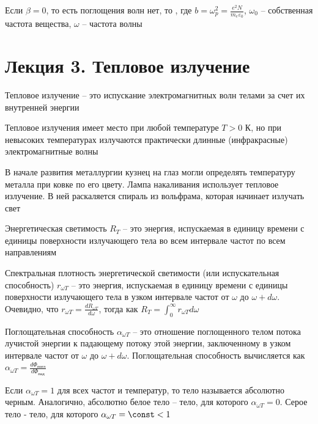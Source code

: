 \documentclass[12pt]{article}
\begin{document}
Если $\beta = 0$, то есть поглощения волн нет, то , где $b = \omega_p^2 = \frac{e^2 N}{m_e \varepsilon_0}$, $\omega_0$ -- собственная частота вещества, $\omega$ -- частота волны


\section{Лекция 3. Тепловое излучение}

Тепловое излучение -- это испускание электромагнитных волн телами за счет их внутренней энергии

Тепловое излучения имеет место при любой температуре $T > 0$ К, но при невысоких температурах излучаются практически длинные (инфракрасные) электромагнитные волны

В начале развития металлургии кузнец на глаз могли определять температуру металла при ковке по его цвету. Лампа накаливания использует тепловое излучение. В ней раскаляется спираль из вольфрама, которая начинает излучать свет

Энергетическая светимость $R_{T}$ -- это энергия, испускаемая в единицу времени с единицы поверхности излучающего тела во всем интервале частот по всем направлениям

Спектральная плотность энергетической светимости (или испускательная способность) $r_{\omega T}$ -- это энергия, испускаемая в единицу времени с единицы поверхности излучающего тела в узком интервале частот от $\omega$ до $\omega + d \omega$. Очевидно, что $r_{\omega T} = \frac{d R_{\omega T}}{d \omega}$, тогда как $R_T = \int_0^\infty r_{\omega T} d\omega$

Поглощательная способность $\alpha_{\omega T}$ -- это отношение поглощенного телом потока лучистой энергии к падающему потоку этой энергии, заключенному в узком интервале частот от $\omega$ до $\omega + d\omega$. Поглощательная способность вычисляется как $\alpha_{\omega T} = \frac{d \Phi_{\text{погл}}}{d \Phi_{\text{пад}}}$

Если $\alpha_{\omega T} = 1$ для всех частот и температур, то тело называется абсолютно черным. Аналогично, абсолютно белое тело -- тело, для которого $\alpha_{\omega T} = 0$. Серое тело - тело, для которого $\alpha_{\omega T} = \const < 1$

\mediumvspace

\end{document}
